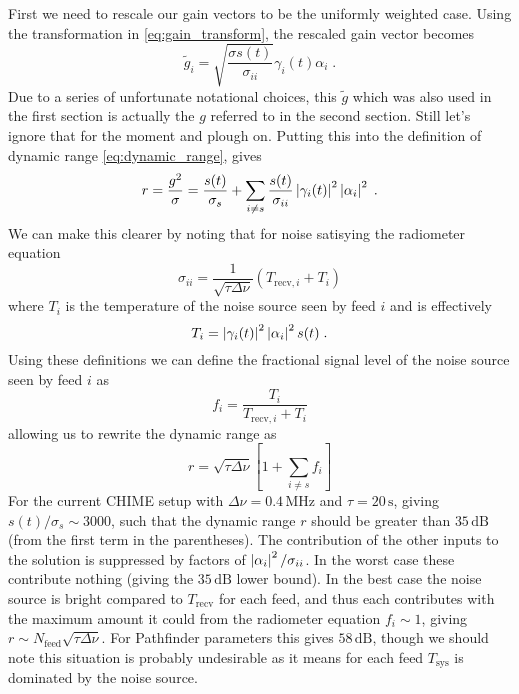 \documentclass[oldfontcommands,letter,11pt,oneside,article]{memoir}
\begin{document}
First we need to rescale our gain vectors to be the uniformly weighted case.
Using the transformation in \eqref{eq:gain_transform}, the rescaled gain vector
becomes
\begin{equation}
    \label{eq:gain_rescaled}
    \tilde{g}_i = \sqrt{\frac{\sigma s(t)}{\sigma_{ii}}} \gamma_i(t) \alpha_i \; .
\end{equation}
Due to a series of unfortunate notational choices, this $\tilde{g}$ which was
also used in the first section is actually the $g$ referred to in the second
section. Still let's ignore that for the moment and plough on. Putting this into the definition of dynamic range \eqref{eq:dynamic_range}, gives
\begin{equation}
    r = \frac{g^2}{\sigma} = \frac{s(t)}{\sigma_s} + \sum_{i \ne s} \frac{s(t)}{\sigma_{ii}} \left\lvert \gamma_i(t) \right\rvert^2 \left\lvert \alpha_i \right\rvert^2 \; .
\end{equation}
We can make this clearer by noting that for noise satisying the radiometer equation
\begin{equation}
    \sigma_{ii} = \frac{1}{\sqrt{\tau \Delta\nu}} (T_{\text{recv},i} + T_i)
\end{equation}
where $T_i$ is the temperature of the noise source seen by feed $i$ and is effectively
\begin{equation}
    T_i = \left\lvert \gamma_i(t) \right\rvert^2 \left\lvert \alpha_i \right\rvert^2 s(t) \; .
\end{equation}
Using these definitions we can define the fractional signal level of the noise source seen by feed $i$ as
\begin{equation}
    f_i = \frac{T_i}{T_{\text{recv},i} + T_i}
\end{equation}
allowing us to rewrite the dynamic range as
\begin{equation}
    r = \sqrt{\tau \Delta\nu} \left[ 1 + \sum_{i \ne s} f_i \right]
\end{equation}
For the current CHIME setup with $\Delta\nu = 0.4\,\mathrm{MHz}$ and $\tau =
20\,\mathrm{s}$, giving $s(t) / \sigma_s \sim 3000$, such that the dynamic range
$r$ should be greater than $35\,\mathrm{dB}$ (from the first term in the
parentheses). The contribution of the other inputs to the solution is suppressed
by factors of $\left\lvert \alpha_i \right\rvert^2 / \sigma_{ii}$. In the worst case these
contribute nothing (giving the $35\,\mathrm{dB}$ lower bound). In the best case
the noise source is bright compared to $T_\text{recv}$ for each feed, and thus
each contributes with the maximum amount it could from the radiometer equation
$f_i \sim 1$, giving $r \sim N_\text{feed} \sqrt{\tau \Delta\nu}$. For
Pathfinder parameters this gives $58\,\mathrm{dB}$, though we should note this
situation is probably undesirable as it means for each feed $T_\text{sys}$ is
dominated by the noise source.
\end{document}
